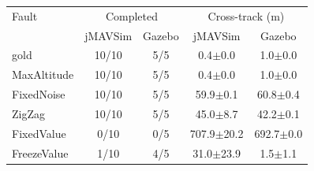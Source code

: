 \begin{tabular}{lcccc}
\toprule
Fault & \multicolumn{2}{c}{Completed} & \multicolumn{2}{c}{Cross-track (m)} \\
 & jMAVSim & Gazebo & jMAVSim & Gazebo \\
\midrule
gold & 10/10 & 5/5 & 0.4$\pm$0.0 & 1.0$\pm$0.0 \\
MaxAltitude & 10/10 & 5/5 & 0.4$\pm$0.0 & 1.0$\pm$0.0 \\
FixedNoise & 10/10 & 5/5 & 59.9$\pm$0.1 & 60.8$\pm$0.4 \\
ZigZag & 10/10 & 5/5 & 45.0$\pm$8.7 & 42.2$\pm$0.1 \\
FixedValue & 0/10 & 0/5 & 707.9$\pm$20.2 & 692.7$\pm$0.0 \\
FreezeValue & 1/10 & 4/5 & 31.0$\pm$23.9 & 1.5$\pm$1.1 \\
\bottomrule
\end{tabular}
